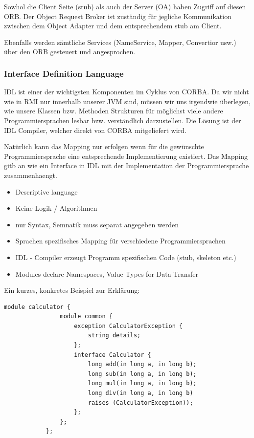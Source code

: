 			Sowhol die Client Seite (stub) als auch der Server (OA) haben Zugriff auf diesen ORB. Der Object Request Broker ist zuständig für jegliche Kommunikation zwischen dem Object Adapter und dem entsprechendem stub am Client.
			
			Ebenfalls werden sämtliche Services (NameService, Mapper, Convertior usw.) über den ORB gesteuert und angesprochen.
			
			\subsubsection{Interface Definition Language \cite{corbaPDF} \cite{omgCorba}}
			IDL ist einer der wichtigsten Komponenten im Cyklus von CORBA. Da wir nicht wie in RMI nur innerhalb unserer JVM sind, müssen wir uns irgendwie überlegen, wie unsere Klassen bzw. Methoden Strukturen für möglichst viele andere Programmiersprachen lesbar bzw. verständlich darzustellen.
			Die Lösung ist der IDL Compiler, welcher direkt von CORBA mitgeliefert wird.
			
			Natürlich kann das Mapping nur erfolgen wenn für die gewünschte Programmiersprache eine entsprechende Implementierung existiert. Das Mapping gitb an wie ein Interface in IDL mit der Implementation der Programmiersprache zusammenhaengt.
			
			\begin{itemize}
				\item Descriptive language
				\item Keine Logik / Algorithmen
				\item nur Syntax, Semnatik muss separat angegeben werden
				\item Sprachen spezifisches Mapping für verschiedene Programmiersprachen
				\item IDL - Compiler erzeugt Programm spezifischen Code (stub, skeleton etc.)
				\item Modules declare Namespaces, Value Types for Data Transfer
			\end{itemize}
			
			Ein kurzes, konkretes Beispiel zur Erklärung:
			
			\begin{lstlisting}[style=C++, caption=IDL Example \cite{corbaPDF}]	
			module calculator {
				module common {
					exception CalculatorException {
						string details;
					};
					interface Calculator {
						long add(in long a, in long b);
						long sub(in long a, in long b);
						long mul(in long a, in long b);
						long div(in long a, in long b)
						raises (CalculatorException));
					};
				};
			};
			\end{lstlisting}
			
